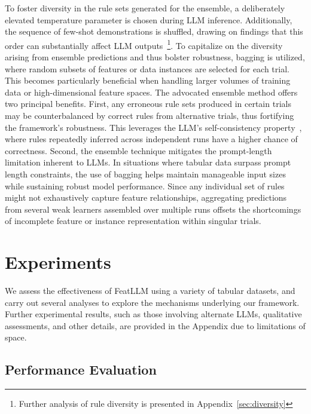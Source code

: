 To foster diversity in the rule sets generated for the ensemble, a deliberately elevated temperature parameter is chosen during LLM inference. Additionally, the sequence of few-shot demonstrations is shuffled, drawing on findings that this order can substantially affect LLM outputs~\cite{lu2022fantastically}\footnote{Further analysis of rule diversity is presented in Appendix~\ref{sec:diversity}}. To capitalize on the diversity arising from ensemble predictions and thus bolster robustness, bagging is utilized, where random subsets of features or data instances are selected for each trial. This becomes particularly beneficial when handling larger volumes of training data or high-dimensional feature spaces. The advocated ensemble method offers two principal benefits. First, any erroneous rule sets produced in certain trials may be counterbalanced by correct rules from alternative trials, thus fortifying the framework’s robustness. This leverages the LLM’s self-consistency property~\cite{wang2022self}, where rules repeatedly inferred across independent runs have a higher chance of correctness. Second, the ensemble technique mitigates the prompt-length limitation inherent to LLMs. In situations where tabular data surpass prompt length constraints, the use of bagging helps maintain manageable input sizes while sustaining robust model performance. Since any individual set of rules might not exhaustively capture feature relationships, aggregating predictions from several weak learners assembled over multiple runs offsets the shortcomings of incomplete feature or instance representation within singular trials.

\section{Experiments}
We assess the effectiveness of \textsf{FeatLLM} using a variety of tabular datasets, and carry out several analyses to explore the mechanisms underlying our framework. Further experimental results, such as those involving alternate LLMs, qualitative assessments, and other details, are provided in the Appendix due to limitations of space.

\subsection{Performance Evaluation}
